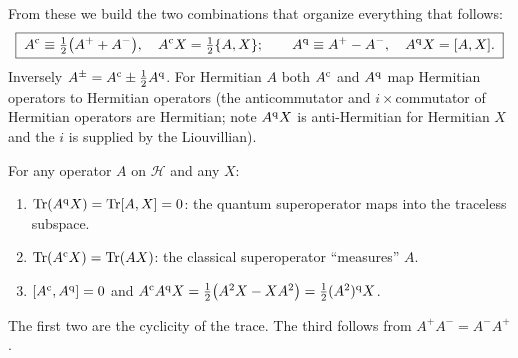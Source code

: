 From these we build the two combinations that organize everything that follows:
\begin{equation}
  \boxed{\;A^{\mathrm{c}}\equiv\tfrac12\big(A^{+}+A^{-}\big),\quad A^{\mathrm{c}}X=\tfrac12\{A,X\};\qquad
  A^{\mathrm{q}}\equiv A^{+}-A^{-},\quad A^{\mathrm{q}}X=[A,X].\;}
  \label{eq:clqu}
\end{equation}
Inversely $A^\pm=A^{\mathrm{c}}\pm\tfrac12A^{\mathrm{q}}$.
For Hermitian $A$ both $A^{\mathrm{c}}$ and $A^{\mathrm{q}}$ map Hermitian operators to Hermitian operators (the anticommutator and $i\times$commutator of Hermitian operators are Hermitian; note $A^{\mathrm{q}} X$ is anti-Hermitian for Hermitian $X$ and the $i$ is supplied by the Liouvillian).

\begin{keybox}
For any operator $A$ on $\mathcal H$ and any $X$:
\begin{enumerate}[itemsep=1pt]
\item $\operatorname{Tr}(A^{\mathrm{q}} X)=\operatorname{Tr}[A,X]=0$: the quantum superoperator maps into the traceless subspace.
\item $\operatorname{Tr}(A^{\mathrm{c}} X)=\operatorname{Tr}(AX)$: the classical superoperator ``measures'' $A$.
\item $[A^{\mathrm{c}},A^{\mathrm{q}}]=0$ and $A^{\mathrm{c}} A^{\mathrm{q}} X=\tfrac12\big(A^2X-XA^2\big)=\tfrac12(A^2)^{\mathrm{q}} X$.
\end{enumerate}
The first two are the cyclicity of the trace.
The third follows from $A^+A^-=A^-A^+$.
\end{keybox}

